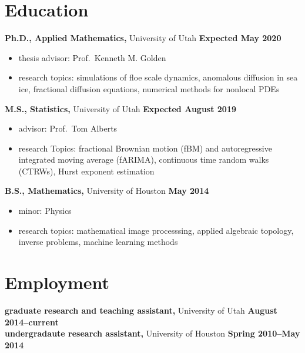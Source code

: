 \documentclass[margin,line]{res}
\begin{document}
\newcommand{\myname}{Huy Dinh}
\newlength{\mynamewidth}
\settowidth{\mynamewidth}{\namefont\myname}

\name{\hspace*{0.5\textwidth}\hspace{-0.5\mynamewidth} \myname \vspace*{.2in}}
\thispagestyle{empty}

\begin{resume}



\section{\sc Education}
{\bf Ph.D., Applied Mathematics,} University of Utah \hfill {\bf Expected May 2020}\\
\vspace*{-.1in}
\begin{itemize}
\item[ ] thesis advisor: Prof.\ Kenneth M. Golden
\item[ ] research topics: simulations of floe scale dynamics, anomalous diffusion in sea ice, fractional diffusion equations, numerical methods for nonlocal PDEs
\end{itemize}

{\bf M.S., Statistics,} University of Utah \hfill {\bf Expected August 2019}\\
\vspace*{-.1in}
\begin{itemize}
\item[ ] advisor: Prof.\ Tom Alberts
\item[ ] research Topics: fractional Brownian motion (fBM) and autoregressive integrated moving average (fARIMA), continuous time random walks (CTRWs), Hurst exponent estimation
\end{itemize}

{\bf B.S., Mathematics,} University of Houston \hfill {\bf May 2014}\\
\vspace*{-.1in}
\begin{itemize}
\item[ ] minor: Physics
\item[ ] research topics: mathematical image processsing, applied algebraic topology, inverse problems, machine learning methods
\end{itemize}

\section{\sc Employment}
{\bf graduate research and teaching assistant,} University of Utah \hfill {\bf August 2014--current}\\
{\bf undergradaute research assistant,} University of Houston \hfill {\bf Spring 2010--May 2014}\\


\end{resume}
\end{document}
